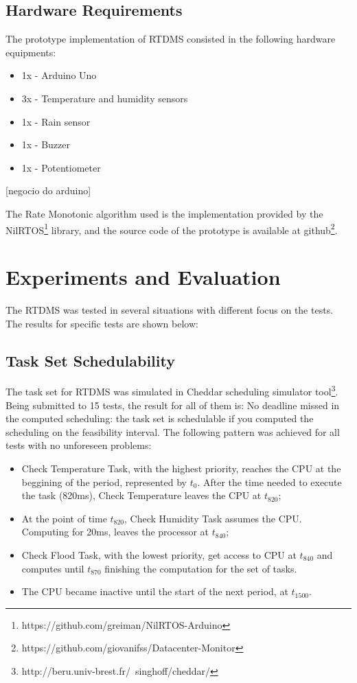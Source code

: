 \documentclass[12pt]{article}
\begin{document}
\subsection{Hardware Requirements}

The prototype implementation of RTDMS consisted in the following hardware equipments:
\begin{itemize}
 \item 1x - Arduino Uno
 \item 3x - Temperature and humidity sensors
 \item 1x - Rain sensor
 \item 1x - Buzzer
 \item 1x - Potentiometer
\end{itemize}


[negocio do arduino]

The Rate Monotonic algorithm used is the implementation provided by the NilRTOS\footnote{https://github.com/greiman/NilRTOS-Arduino} 
library, and the source code of the prototype is available at github\footnote{https://github.com/giovanifss/Datacenter-Monitor}.

\section{Experiments and Evaluation}

The RTDMS was tested in several situations with different focus on the tests. The results for specific tests are shown below:

\subsection{Task Set Schedulability}

The task set for RTDMS was simulated in Cheddar scheduling simulator tool\footnote{http://beru.univ-brest.fr/~singhoff/cheddar/}.
Being submitted to 15 tests, the result for all of them is: No deadline missed in the computed scheduling: the task set is 
schedulable if you computed the scheduling on the feasibility interval. The following pattern was achieved for all tests with 
no unforeseen problems:
\begin{itemize}
 \item Check Temperature Task, with the highest priority, reaches the CPU at the beggining of the period, represented by
\(t_0\). After the time needed to execute the task (820ms), Check Temperature leaves the CPU at \(t_{820}\);
 \item At the point of time \(t_{820}\), Check Humidity Task assumes the CPU. Computing for 20ms, leaves the processor at 
\(t_{840}\);
 \item Check Flood Task, with the lowest priority, get access to CPU at \(t_{840}\) and computes until \(t_{870}\) finishing
the computation for the set of tasks.
 \item The CPU became inactive until the start of the next period, at \(t_{1500}\).
\end{itemize}
\end{document}
